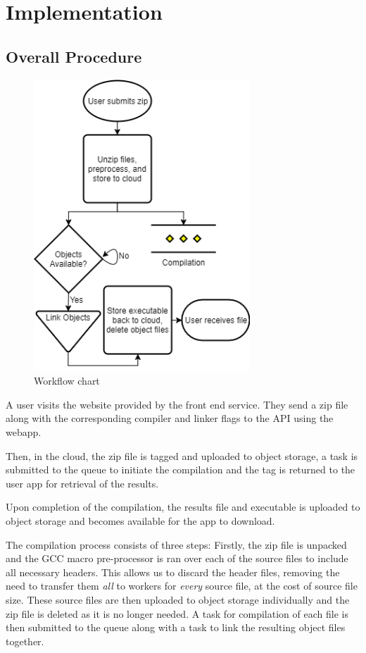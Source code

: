\documentclass[conference]{IEEEtran}
\begin{document}

\section{Implementation}
\subsection{Overall Procedure}
\begin{figure}[ht] %
    \centering
    \includegraphics[width=3.2in]{WorkArchitecture.png}
    \caption{Workflow chart}
    \label{fig:overview}
\end{figure}

A user visits the website provided by the front end service. They send a zip file along with the corresponding compiler and linker flags to the API using the webapp.

Then, in the cloud, the zip file is tagged and uploaded to object storage, a task is submitted to the queue to initiate the compilation and the tag is returned to the user app for retrieval of the results.

Upon completion of the compilation, the results file and executable is uploaded
to object storage and becomes available for the app to download.

The compilation process consists of three steps:
Firstly, the zip file is unpacked and the GCC macro pre-processor is ran over each of
the source files to include all necessary headers. This allows us to discard the
header files, removing the need to transfer them \emph{all} to workers for
\emph{every} source file, at the cost of source file size. These source files
are then uploaded to object storage individually and the zip file is deleted as it is no longer needed. A task for compilation of each file is then submitted to the queue along with a task to link the resulting object files together.
\end{document}
